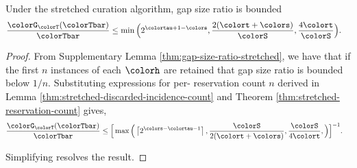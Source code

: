 \begin{theorem}
\label{thm:stretched-gap-size}
Under the stretched curation algorithm, gap size ratio is bounded
\begin{align*}
\frac{\colorG_{\colorT}(\colorTbar)}{\colorTbar}
&\leq
\min\Big(
  2^{\colortau+1-\colors},
  \frac{2(\colort + \colors)}{\colorS},
  \frac{4\colort}{\colorS}
\Big).
\end{align*}
\end{theorem}
\begin{proof}

From Supplementary Lemma \ref{thm:gap-size-ratio-stretched}, we have that if the first $n$ instances of each \hv{} $\colorh$ are retained that gap size ratio is bounded below $1/n$.
Substituting expressions for per-\hv{} reservation count $n$ derived in Lemma \ref{thm:stretched-discarded-incidence-count} and Theorem \ref{thm:stretched-reservation-count} gives,
\begin{align*}
  \frac{\colorG_{\colorT}(\colorTbar)}{\colorTbar}
  &\leq
  \Big[
    \max\Big(
      \left\lceil 2^{\colors - \colortau - 1} \right\rceil,
      \frac{\colorS}{2(\colort + \colors)},
      \frac{\colorS}{4\colort},
    \Big)
  \Big]^{-1}.
\end{align*}

Simplifying resolves the result.

\end{proof}
